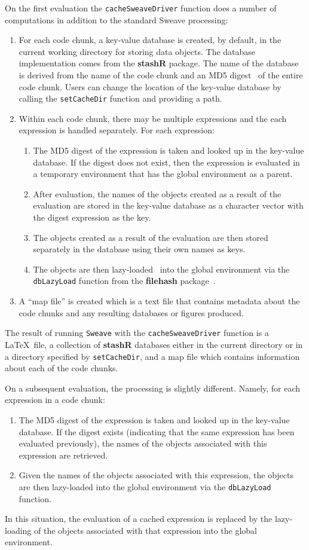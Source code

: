 \documentclass{article}
\newcommand{\code}{\texttt}
\newcommand{\pkg}{\textbf}
\begin{document}
On the first evaluation the \code{cacheSweaveDriver} function does a
number of computations in addition to the standard Sweave processing:
\begin{enumerate}
\item
For each code chunk, a key-value database is created, by default, in
the current working directory for storing data objects.  The database
implementation comes from the \pkg{stashR} package.  The name of the
database is derived from the name of the code chunk and an MD5
digest~\citep{md5:1992} of the entire code chunk.  Users can change
the location of the key-value database by calling the
\code{setCacheDir} function and providing a path.
\item
Within each code chunk, there may be multiple expressions and the each
expression is handled separately.  For each expression:
\begin{enumerate}
\item
The MD5 digest of the expression is taken and looked up in the
key-value database.  If the digest does not exist, then the expression
is evaluated in a temporary environment that has the global
environment as a parent.
\item
After evaluation, the names of the objects created as a result of the
evaluation are stored in the key-value database as a character vector
with the digest expression as the key.
\item
The objects created as a result of the evaluation are then stored
separately in the database using their own names as keys.
\item
The objects are then lazy-loaded~\citep[see e.g.][]{rnews:ripley:2004}
into the global environment via the \code{dbLazyLoad} function from
the \pkg{filehash} package~\citep{peng:2006}.
\end{enumerate}
\item
A ``map file'' is created which is a text file that contains metadata
about the code chunks and any resulting databases or figures produced.
\end{enumerate}
The result of running \code{Sweave} with the \code{cacheSweaveDriver}
function is a \LaTeX\ file, a collection of \pkg{stashR} databases
either in the current directory or in a directory specified by
\code{setCacheDir}, and a map file which contains information about
each of the code chunks.

On a subsequent evaluation, the processing is slightly different.
Namely, for each expression in a code chunk:
\begin{enumerate}
\item
The MD5 digest of the expression is taken and looked up in the
key-value database.  If the digest exists (indicating that the same
expression has been evaluated previously), the names of the objects
associated with this expression are retrieved.
\item
Given the names of the objects associated with this expression, the
objects are then lazy-loaded into the global environment via the
\code{dbLazyLoad} function.
\end{enumerate}
In this situation, the evaluation of a cached expression is replaced
by the lazy-loading of the objects associated with that expression
into the global environment.
\end{document}
